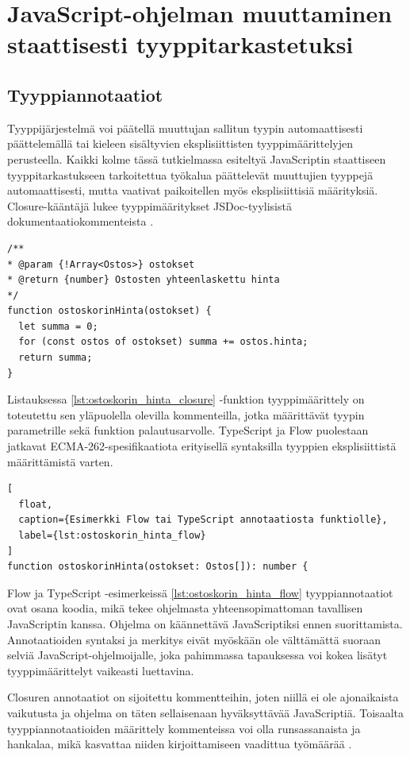 \chapter{JavaScript-ohjelman muuttaminen staattisesti tyyppitarkastetuksi}

\section{Tyyppiannotaatiot}

Tyyppijärjestelmä voi päätellä muuttujan sallitun tyypin automaattisesti
päättelemällä tai kieleen sisältyvien eksplisiittisten tyyppimäärittelyjen
perusteella. Kaikki kolme tässä tutkielmassa esiteltyä JavaScriptin staattiseen
tyyppitarkastukseen tarkoitettua työkalua päättelevät muuttujien tyyppejä automaattisesti,
mutta vaativat paikoitellen myös eksplisiittisiä määrityksiä.
Closure-kääntäjä lukee
tyyppimääritykset JSDoc-tyylisistä dokumentaatiokommenteista \cite{annotatingJSforClosure}.
\begin{lstlisting}[caption={Esimerkki Closure-annotaatiosta funktiolle},label={lst:ostoskorin_hinta_closure}]
/**
* @param {!Array<Ostos>} ostokset
* @return {number} Ostosten yhteenlaskettu hinta
*/
function ostoskorinHinta(ostokset) {
  let summa = 0;
  for (const ostos of ostokset) summa += ostos.hinta;
  return summa;
}
\end{lstlisting}
Listauksessa \ref{lst:ostoskorin_hinta_closure} -funktion
tyyppimäärittely on toteutettu sen yläpuolella olevilla kommenteilla, jotka määrittävät
tyypin  parametrille sekä funktion palautusarvolle.
TypeScript ja Flow puolestaan jatkavat ECMA-262-spe\-si\-fi\-kaa\-ti\-o\-ta
erityisellä syntaksilla tyyppien eksplisiittistä määrittämistä varten. 
\begin{lstlisting}[
  float,
  caption={Esimerkki Flow tai TypeScript annotaatiosta funktiolle},
  label={lst:ostoskorin_hinta_flow}
]
function ostoskorinHinta(ostokset: Ostos[]): number {
\end{lstlisting}
Flow ja TypeScript -esimerkeissä \ref{lst:ostoskorin_hinta_flow}
tyyppiannotaatiot ovat osana koodia, mikä
tekee ohjelmasta yhteensopimattoman tavallisen JavaScriptin kanssa. Ohjelma
on käännettävä JavaScriptiksi ennen suorittamista. Annotaatioiden
syntaksi ja merkitys eivät myöskään ole välttämättä suoraan selviä
JavaScript-ohjelmoijalle, joka pahimmassa tapauksessa voi kokea lisätyt
tyyppimäärittelyt vaikeasti luettavina. 

Closuren annotaatiot on sijoitettu kommentteihin, joten niillä ei ole
ajonaikaista vaikutusta ja ohjelma on täten sellaisenaan hyväksyttävää
JavaScriptiä. Toisaalta tyyppiannotaatioiden määrittely kommenteissa voi
olla runsassanaista ja hankalaa, mikä kasvattaa niiden kirjoittamiseen vaadittua
työmäärää \cite{TypeScriptSpec, TypeScriptatBuild}.


